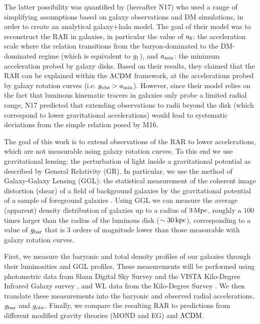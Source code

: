 \documentclass[usenatbib]{mnras}
\newcommand{\lcdm}{{\rm \Lambda CDM}}
\newcommand{\un}[1]{_{\rm #1}}
\begin{document}
The latter possibility was quantified by \cite{navarro2017} (hereafter N17) who used a range of simplifying assumptions based on galaxy observations and DM simulations, in order to create an analytical galaxy+halo model. The goal of their model was to reconstruct the RAR in galaxies, in particular the value of $a\un{0}$: the acceleration scale where the relation transitions from the baryon-dominated to the DM-dominated regime (which is equivalent to $g\un{\dagger}$), and $a\un{min}$: the minimum acceleration probed by galaxy disks. Based on their results, they claimed that the RAR can be explained within the $\lcdm$ framework, at the accelerations probed by galaxy rotation curves (i.e. $g\un{obs}>a\un{min}$). However, since their model relies on the fact that luminous kinematic tracers in galaxies only probe a limited radial range, N17 predicted that extending observations to radii beyond the disk (which correspond to lower gravitational accelerations) would lead to systematic deviations from the simple relation posed by M16.

The goal of this work is to extend observations of the RAR to lower accelerations, which are not measurable using galaxy rotation curves. To this end we use gravitational lensing: the perturbation of light inside a gravitational potential as described by General Relativity (GR). In particular, we use the method of Galaxy-Galaxy Lensing (GGL): the statistical measurement of the coherent image distortion (shear) of a field of background galaxies by the gravitational potential of a sample of foreground galaxies \cite[for examples, see e.g.][]{fischer2000ggl,hoekstra2004,mandelbaum2006,uitert2016}. Using GGL we can measure the average (apparent) density distribution of galaxies up to a radius of $3\,{\rm Mpc}$, roughly a $100$ times larger than the radius of the luminous disk ($\sim 30\,{\rm kpc}$), corresponding to a value of $g\un{bar}$ that is $3$ orders of magnitude lower than those measurable with galaxy rotation curves.

First, we measure the baryonic and total density profiles of our galaxies through their luminosities and GGL profiles. These measurements will be performed using photometric data from Sloan Digital Sky Survey \cite[SDSS,]{abazajian2009} and the VISTA Kilo-Degree Infrared Galaxy survey \cite[VIKING]{edge2013}, and WL data from the Kilo-Degree Survey \cite[KiDS;][]{dejong2013}. We then translate these measurements into the baryonic and observed radial accelerations, $g\un{bar}$ and $g\un{obs}$. Finally, we compare the resulting RAR to predictions from different modified gravity theories (MOND and EG) and $\lcdm$.
\end{document}
